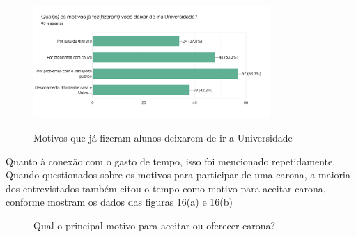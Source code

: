 \begin{figure}[!hbtp]
	\centering
	\caption{Motivos que já fizeram alunos deixarem de ir a Universidade}
	\includegraphics[width=0.8\textwidth]{./04-figuras/questionario/12.png}
	\label{fig:motivos-nao-ir-a-unifao}
\end{figure}

Quanto à conexão com o gasto de tempo, isso foi mencionado repetidamente. Quando questionados sobre os motivos para participar de uma carona, a maioria dos entrevistados também citou o tempo como motivo para aceitar carona, conforme mostram os dados das figuras 16(a) e 16(b)

\begin{figure}[h]
	
	\center
	\qquad
	\caption{Qual o principal motivo para aceitar ou oferecer carona?}
	
\end{figure}



